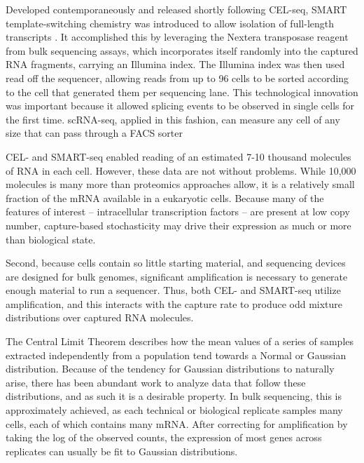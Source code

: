 Developed contemporaneously and released shortly following CEL-seq, SMART template-switching chemistry was introduced to allow isolation of full-length transcripts \citep{Ramskoeld2012}.
It accomplished this by leveraging the Nextera transposase reagent from bulk sequencing assays, which incorporates itself randomly into the captured RNA fragments, carrying an Illumina index. 
The Illumina index was then used read off the sequencer, allowing reads from up to 96 cells to be sorted according to the cell that generated them per sequencing lane.
This technological innovation was important because it allowed splicing events to be observed in single cells for the first time.
scRNA-seq, applied in this fashion, can measure any cell of any size that can pass through a FACS sorter

CEL- and SMART-seq enabled reading of an estimated 7-10 thousand molecules of RNA in each cell. 
However, these data are not without problems. 
While 10,000 molecules is many more than proteomics approaches allow, it is a relatively small fraction of the mRNA available in a eukaryotic cells. 
Because many of the features of interest -- intracellular transcription factors -- are present at low copy number, capture-based stochasticity may drive their expression as much or more than biological state. 

Second, because cells contain so little starting material, and sequencing devices are designed for bulk genomes, significant amplification is necessary to generate enough material to run a sequencer. 
Thus, both CEL- and SMART-seq utilize amplification, and this interacts with the capture rate to produce odd mixture distributions over captured RNA molecules. 

The Central Limit Theorem describes how the mean values of a series of samples extracted independently from a population tend towards a Normal or Gaussian distribution.
Because of the tendency for Gaussian distributions to naturally arise, there has been abundant work to analyze data that follow these distributions, and as such it is a desirable property. 
In bulk sequencing, this is approximately achieved, as each technical or biological replicate samples many cells, each of which contains many mRNA. 
After correcting for amplification by taking the log of the observed counts, the expression of most genes across replicates can usually be fit to Gaussian distributions. %

